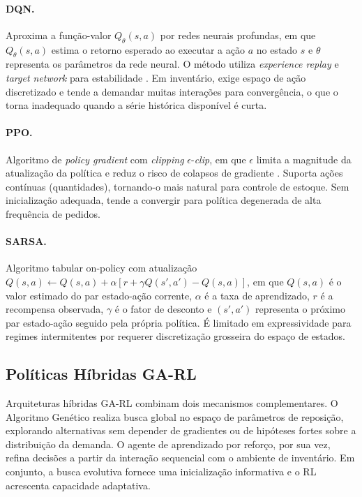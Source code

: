 \paragraph{DQN.}
Aproxima a função-valor $Q_\theta(s, a)$ por redes neurais profundas, em que $Q_\theta(s, a)$ estima o retorno esperado ao executar a ação $a$ no estado $s$ e $\theta$ representa os parâmetros da rede neural. O método utiliza \textit{experience replay} e \textit{target network} para estabilidade \citep{Mnih2015DQN}. Em inventário, exige espaço de ação discretizado e tende a demandar muitas interações para convergência, o que o torna inadequado quando a série histórica disponível é curta.

\paragraph{PPO.}
Algoritmo de \textit{policy gradient} com \textit{clipping} $\epsilon$-\textit{clip}, em que $\epsilon$ limita a magnitude da atualização da política e reduz o risco de colapsos de gradiente \citep{Schulman2017PPO}. Suporta ações contínuas (quantidades), tornando-o mais natural para controle de estoque. Sem inicialização adequada, tende a convergir para política degenerada de alta frequência de pedidos.

\paragraph{SARSA.}
Algoritmo tabular on-policy com atualização $Q(s,a) \leftarrow Q(s,a) + \alpha[r + \gamma Q(s',a') - Q(s,a)]$, em que $Q(s,a)$ é o valor estimado do par estado-ação corrente, $\alpha$ é a taxa de aprendizado, $r$ é a recompensa observada, $\gamma$ é o fator de desconto e $(s',a')$ representa o próximo par estado-ação seguido pela própria política. É limitado em expressividade para regimes intermitentes por requerer discretização grosseira do espaço de estados.

\subsection{Políticas Híbridas GA-RL}
\label{sec:ga_rl_arch}

Arquiteturas híbridas GA-RL combinam dois mecanismos complementares. O Algoritmo Genético realiza busca global no espaço de parâmetros de reposição, explorando alternativas sem depender de gradientes ou de hipóteses fortes sobre a distribuição da demanda. O agente de aprendizado por reforço, por sua vez, refina decisões a partir da interação sequencial com o ambiente de inventário. Em conjunto, a busca evolutiva fornece uma inicialização informativa e o RL acrescenta capacidade adaptativa.

